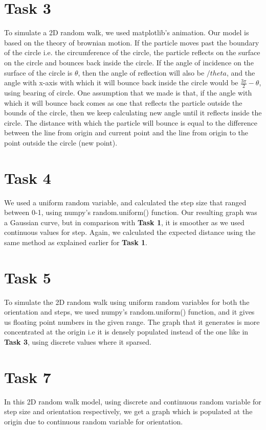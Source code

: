 \documentclass{article}
\begin{document}
    \section*{Task 3}
    To simulate a 2D random walk, we used matplotlib's animation. Our model is based on the theory of brownian motion. If the particle moves past 
    the boundary of the circle i.e. the circumference of the circle, the particle reflects on the surface on the circle and bounces back 
    inside the circle. If the angle of incidence on the surface of the circle is $\theta$, then the angle of reflection will also be $/theta$, and the angle with x-axis with which it will bounce
    back inside the circle would be $\frac{3\pi}{2} - \theta$, using bearing of circle. One assumption that we made is that, if the angle with which it will bounce back comes as one that reflects the particle 
    outside the bounds of the circle, then we keep calculating new angle until it reflects inside the circle.
    The distance with which the particle will bounce is equal to the difference between the line from origin and current point and the line from origin to the point outside the circle (new point).
    
    \section*{Task 4}
    We used a uniform random variable, and calculated the step size that ranged between 0-1, using numpy's random.uniform() function.
    Our resulting graph was a Gaussian curve, but in comparison with \textbf{Task 1}, it is smoother as we used continuous values for step.
    Again, we calculated the expected distance using the same method as explained earlier for \textbf{Task 1}.

    \section*{Task 5}
    To simulate the 2D random walk using uniform random variables for both the orientation and steps, we used numpy's random.uniform() function, and it gives us floating point numbers in the given range.
    The graph that it generates is more concentrated at the origin i.e it is densely populated instead of the one like in \textbf{Task 3}, using discrete values where it sparsed.

    \section*{Task 7}
    In this 2D random walk model, using discrete and continuous random variable for step size and orientation respectively, we get a graph which is populated at the origin due to continuous random variable for 
    orientation.
\end{document}
